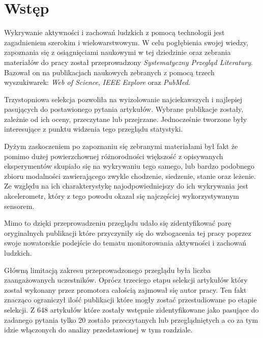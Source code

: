 \section{Wstęp}
Wykrywanie aktywności i zachowań ludzkich z pomocą technologii jest zagadnieniem szerokim i wielowarstwowym. W celu pogłębienia swojej wiedzy, zapoznania się z osiągnięciami naukowymi w tej dziedzinie oraz zebrania materiałów do pracy został przeprowadzony \textit{Systematyczny Przegląd Literatury}. Bazował on na publikacjach naukowych zebranych z pomocą trzech wyszukiwarek: \textit{Web of Science}, \textit{IEEE Explore} oraz \textit{PubMed}. 

Trzystopniowa selekcja pozwoliła na wyizolowanie najciekawszych i najlepiej pasujących do postawionego pytania artykułów. Wybrane publikacje zostały, zależnie od ich oceny, przeczytane lub przejrzane. Jednocześnie tworzone były interesujące z punktu widzenia tego przeglądu statystyki. 

Dyżym zaskoczeniem po zapoznaniu się zebranymi materiałami był fakt że pomimo dużej powierzchownej  różnorodności większość z opisywanych eksperymentów skupiało się na wykrywaniu tego samego, lub bardzo podobnego zbioru modalności zawierającego zwykle chodzenie, siedzenie, stanie oraz leżenie. Ze względu na ich charakterystykę najodpowiedniejszy do ich wykrywania jest akcelerometr, który z tego powodu okazał się najczęściej wykorzystywanym sensorem.

Mimo to dzięki przeprowadzeniu przeglądu udało się zidentyfikować parę oryginalnych publikacji które przyczyniły się do wzbogacenia tej pracy poprzez swoje nowatorskie podejście do tematu monitorowania aktywności i zachowań ludzkich.

Główną limitacją zakresu przeprowadzonego przeglądu była liczba zaangażowanych uczestników. Oprócz trzeciego etapu selekcji artykułów który został wykonany przez promotora całością zajmował się autor pracy. Ten fakt znacząco ograniczył ilość publikacji które mogły zostać przestudiowane po etapie selekcji. Z 648 artykułów które zostały wstępnie zidentyfikowane jako pasujące do zadanego pytania tylko 20 zostało przeczytanych lub przeglądniętych a co za tym idzie włączonych do analizy przedstawionej w tym rozdziale.
